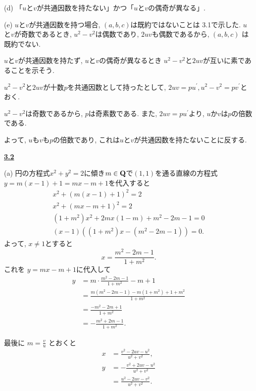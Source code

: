 \documentclass{jarticle}
\newcommand{\cnt}[1]{\noindent \underline{\textbf{#1}}}
\begin{document}

\noindent (d) %
「$u$と$v$が共通因数を持たない」かつ「$u$と$v$の偶奇が異なる」.

\noindent (e) %
$u$と$v$が共通因数を持つ場合, $(a, b, c)$は既約ではないことは 3.1で示した.
$u$と$v$が奇数であるとき, $u^2 - v^2$は偶数であり, $2uv$も偶数であるから, $(a, b, c)$
  は既約でない.

$u$と$v$が共通因数を持たず, $u$と$v$の偶奇が異なるとき $u^2 -
v^2$と$2uv$が互いに素であることを示そう.

$u^2 - v^2$と$2uv$が十数$p$を共通因数として持ったとして, $2uv = pu^\prime, u^2-v^2 =
pv^\prime$とおく.

$u^2 - v^2$は奇数であるから, $p$は奇素数である.
また, $2uv=pu^\prime$より, $u$か$v$は$p$の倍数である.

よって, $u$も$v$も$p$の倍数であり, これは$u$と$v$が共通因数を持たないことに反する.


\cnt{3.2} %

\noindent (a) %
円の方程式$x^2 + y^2 = 2$に傾き$m \in \mathbf{Q}$で$(1, 1)$を通る直線の方程式
$y = m(x-1) + 1 = mx - m + 1$を代入すると
\begin{align*}
x^2 + (m(x-1) + 1)^2 = 2 \\
x^2 + (mx - m + 1)^2 = 2 \\
(1 + m^2)x^2 + 2mx(1 - m) + m^2 - 2m - 1 = 0 \\
(x - 1)((1 + m^2)x - (m^2 - 2m - 1)) = 0.
\end{align*}
よって, $x \neq 1$とすると
\[
  x = \frac{m^2 - 2m - 1}{1 + m^2}.
\]
これを $y = mx - m + 1$に代入して
\begin{align*}
y
  &= m \cdot \frac{m^2 - 2m - 1}{1 + m^2} - m + 1 \\
  &= \frac{m(m^2 - 2m - 1) - m (1 + m^2) + 1 + m^2}{1 + m^2} \\
  &= \frac{-m^2 - 2m + 1}{1 + m^2} \\
  &= - \frac{m^2 + 2m - 1}{1 + m^2}.
\end{align*}

最後に $m = \frac{v}{u}$ とおくと
\begin{align*}
  x
    &= \frac{v^2 - 2uv - u^2}{u^2 + v^2}, \\
  y
    &= - \frac{v^2 + 2uv - u^2}{u^2 + v^2} \\
    &= \frac{u^2 - 2uv - v^2}{u^2 + v^2}.
\end{align*}

\end{document}
